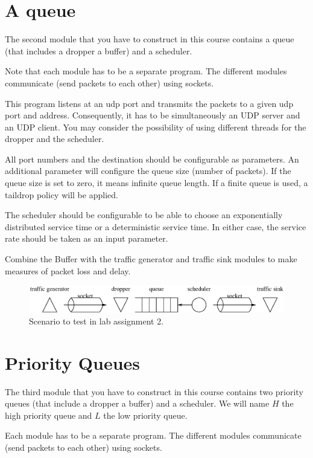 \section{A queue}

The second module that you have to construct in this course contains a queue (that includes a dropper a buffer) and a scheduler.

Note that each module has to be a separate program. The different modules communicate (send packets to each other) using sockets.

This program listens at an udp port and transmits the packets to a given udp port and address. Consequently, it has to be simultaneously an UDP server and an UDP client. You may consider the possibility of using different threads for the dropper and the scheduler.

All port numbers and the destination should be configurable as parameters. An additional parameter will configure the queue size (number of packets). If the queue size is set to zero, it means infinite queue length. If a finite queue is used, a taildrop policy will be applied.

The scheduler should be configurable to be able to choose an exponentially distributed service time or a deterministic service time. In either case, the service rate should be taken as an input parameter.

Combine the Buffer with the traffic generator and traffic sink modules to make measures of packet loss and delay.

\begin{figure}[!h]
\centering
\includegraphics[width=\linewidth]{figures/scenario2.eps}
\caption{Scenario to test in lab assignment 2.}
\label{fig:scenario2}
\end{figure}

\section{Priority Queues}
The third module that you have to construct in this course contains two priority queues (that include a dropper a buffer) and a scheduler.
We will name $H$ the high priority queue and $L$ the low priority queue.

Each module has to be a separate program. The different modules communicate (send packets to each other) using sockets.

